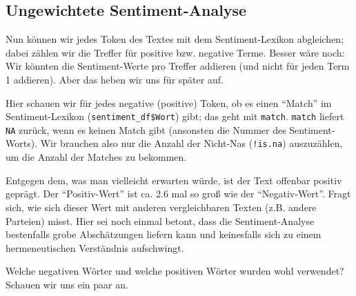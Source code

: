 \documentclass[12pt,]{book}
\newenvironment{Shaded}{\begin{snugshade}}{\end{snugshade}}
\newcommand{\KeywordTok}[1]{\textcolor[rgb]{0.13,0.29,0.53}{\textbf{{#1}}}}
\newcommand{\DecValTok}[1]{\textcolor[rgb]{0.00,0.00,0.81}{{#1}}}
\newcommand{\StringTok}[1]{\textcolor[rgb]{0.31,0.60,0.02}{{#1}}}
\newcommand{\CommentTok}[1]{\textcolor[rgb]{0.56,0.35,0.01}{\textit{{#1}}}}
\newcommand{\NormalTok}[1]{{#1}}
\begin{document}
\subsection{Ungewichtete
Sentiment-Analyse}\label{ungewichtete-sentiment-analyse}

Nun können wir jedes Token des Textes mit dem Sentiment-Lexikon
abgleichen; dabei zählen wir die Treffer für positive bzw. negative
Terme. Besser wäre noch: Wir könnten die Sentiment-Werte pro Treffer
addieren (und nicht für jeden Term 1 addieren). Aber das heben wir uns
für später auf.

\begin{Shaded}
\end{Shaded}

Hier schauen wir für jedes negative (positive) Token, ob es einen
``Match'' im Sentiment-Lexikon (\texttt{sentiment\_df\$Wort}) gibt; das
geht mit \texttt{match}. \texttt{match} liefert \texttt{NA} zurück, wenn
es keinen Match gibt (ansonsten die Nummer des Sentiment-Worts). Wir
brauchen also nur die Anzahl der Nicht-Nas (\texttt{!is.na})
auszuzählen, um die Anzahl der Matches zu bekommen.

Entgegen dem, was man vielleicht erwarten würde, ist der Text offenbar
positiv geprägt. Der ``Positiv-Wert'' ist ca. 2.6 mal so groß wie der
``Negativ-Wert''. Fragt sich, wie sich dieser Wert mit anderen
vergleichbaren Texten (z.B. andere Parteien) misst. Hier sei noch einmal
betont, dass die Sentiment-Analyse bestenfalls grobe Abschätzungen
liefern kann und keinesfalls sich zu einem hermeneutischen Verständnis
aufschwingt.

Welche negativen Wörter und welche positiven Wörter wurden wohl
verwendet? Schauen wir uns ein paar an.
\end{document}
